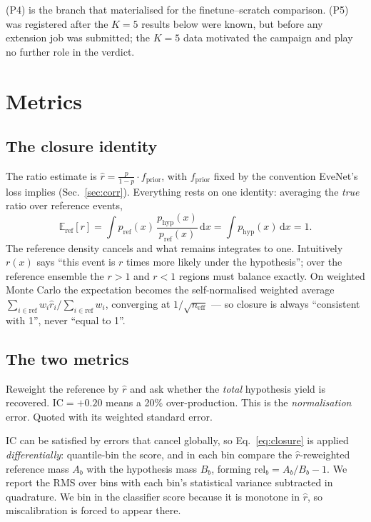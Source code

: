\documentclass[11pt]{article}
\newcommand{\IC}{\ensuremath{\mathrm{IC}}}
\newcommand{\SCr}{\ensuremath{\mathrm{SC_{rms}}}}
\newcommand{\SCn}{\ensuremath{\mathrm{SC_{norm}}}}
\newcommand{\Eref}{\ensuremath{\mathbb{E}_{\mathrm{ref}}}}
\begin{document}
\noindent (P4) is the branch that materialised for the finetune--scratch comparison. (P5)
was registered after the $K{=}5$ results below were known, but before any extension job
was submitted; the $K{=}5$ data motivated the campaign and play no further role in the
verdict.

\section{Metrics}
\label{sec:metrics}

\subsection{The closure identity}

The ratio estimate is $\hat r = \frac{p}{1-p}\cdot f_{\mathrm{prior}}$, with
$f_{\mathrm{prior}}$ fixed by the convention EveNet's loss implies
(Sec.~\ref{sec:corr}). Everything rests on one identity: averaging the \emph{true} ratio
over reference events,
%
\begin{equation}
\Eref[r] = \int p_{\mathrm{ref}}(x)\,\frac{p_{\mathrm{hyp}}(x)}{p_{\mathrm{ref}}(x)}\,
\mathrm{d}x = \int p_{\mathrm{hyp}}(x)\,\mathrm{d}x = 1 .
\label{eq:closure}
\end{equation}
%
The reference density cancels and what remains integrates to one. Intuitively $r(x)$ says
``this event is $r$ times more likely under the hypothesis''; over the reference ensemble
the $r>1$ and $r<1$ regions must balance exactly. On weighted Monte Carlo the expectation
becomes the self-normalised weighted average
$\sum_{i\in\mathrm{ref}} w_i \hat r_i / \sum_{i\in\mathrm{ref}} w_i$, converging at
$1/\sqrt{n_{\mathrm{eff}}}$ --- so closure is always ``consistent with 1'', never ``equal
to 1''.

\subsection{The two metrics}

\begin{description}[leftmargin=2.4em,style=nextline]
\item[{Integral closure, $\IC = \Eref[\hat r]-1$}]
  Reweight the reference by $\hat r$ and ask whether the \emph{total} hypothesis yield is
  recovered. $\IC = +0.20$ means a 20\% over-production. This is the \emph{normalisation}
  error. Quoted with its weighted standard error.
\item[{Shape closure, \SCr\ and \SCn}]
  $\IC$ can be satisfied by errors that cancel globally, so Eq.~\eqref{eq:closure} is
  applied \emph{differentially}: quantile-bin the score, and in each bin compare the
  $\hat r$-reweighted reference mass $A_b$ with the hypothesis mass $B_b$, forming
  $\mathrm{rel}_b = A_b/B_b - 1$. We report the RMS over bins with each bin's statistical
  variance subtracted in quadrature. We bin in the classifier score because it is monotone
  in $\hat r$, so miscalibration is forced to appear there.
\end{description}
\end{document}
